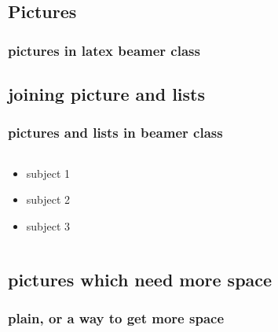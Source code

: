\documentclass{beamer}
\begin{document}
\subsection{Pictures} 
\begin{frame}\frametitle{pictures in latex beamer class}
\end{frame}

\subsection{joining picture and lists} 

\begin{frame}
\frametitle{pictures and lists in beamer class}
\begin{columns}
\begin{column}{5cm}
\begin{itemize}
\item<1-> subject 1
\item<3-> subject 2
\item<5-> subject 3
\end{itemize}
\vspace{3cm} 
\end{column}
\begin{column}{5cm}
\begin{overprint}
\end{overprint}
\end{column}
\end{columns}
\end{frame}


\subsection{pictures which need more space} 
\begin{frame}[plain]
\frametitle{plain, or a way to get more space}
\end{frame}
\end{document}
